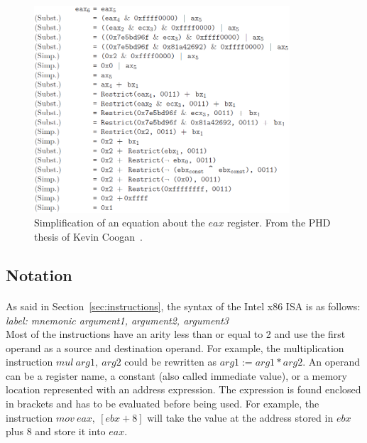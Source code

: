 \begin{figure}[!htb]
	\centering
	\includegraphics[width=0.85\textwidth]{equational_reasoning/equational_reasoning_example_final.png}
	\caption{Simplification of an equation about the $eax$ register. From the PHD thesis of Kevin Coogan~\cite{coogan2011deobfuscation}.}
	\label{fig:equational_reasoning_example_final}
\end{figure}

\pagebreak

\subsection{Notation}
\paragraph{}
As said in Section~\ref{sec:instructions}, the syntax of the Intel x86 ISA is as follows:\\
\textit{label: mnemonic argument1, argument2, argument3}\\
Most of the instructions have an arity less than or equal to 2 and use the first operand as a source and destination operand. For example, the multiplication instruction $mul\ arg1,\ arg2$ could be rewritten as $arg1 := arg1 * arg2$. An operand can be a register name, a constant (also called immediate value), or a memory location represented with an address expression. The expression is found enclosed in brackets and has to be evaluated before being used. For example, the instruction $mov\ eax,\ [ebx+8]$ will take the value at the address stored in $ebx$ plus $8$ and store it into $eax$.

